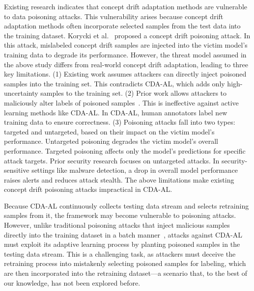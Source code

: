 Existing research indicates that concept drift adaptation methods are vulnerable to data poisoning attacks.
This vulnerability arises because concept drift adaptation methods often incorporate selected samples from the test data into the training dataset.
Korycki et al.~\cite{2023-CCF-B-Adversarial-concept-drift-detection-under-poisoning-attacks} proposed a concept drift poisoning attack. In this attack, mislabeled concept drift samples are injected into the victim model’s training data to degrade its performance.
However, the threat model assumed in the above study differs from real-world concept drift adaptation, leading to three key limitations.
(1) Existing work assumes attackers can directly inject poisoned samples into the training set.
This contradicts CDA-AL, which adds only high-uncertainty samples to the training set.
(2) Prior work allows attackers to maliciously alter labels of poisoned samples~\cite{2022-ACM-Computing-Survey-Threats-to-training}. This is ineffective against active learning methods like CDA-AL. In CDA-AL, human annotators label new training data to ensure correctness.
(3) Poisoning attacks fall into two types: targeted and untargeted, based on their impact on the victim model’s performance.
Untargeted poisoning degrades the victim model’s overall performance. Targeted poisoning affects only the model’s predictions for specific attack targets.
Prior security research focuses on untargeted attacks.
In security-sensitive settings like malware detection, a drop in overall model performance raises alerts and reduces attack stealth.
The above limitations make existing concept drift poisoning attacks impractical in CDA-AL.

Because CDA-AL continuously collects testing data stream and selects retraining samples from it, the framework may become vulnerable to poisoning attacks. 
However, unlike traditional poisoning attacks that inject malicious samples directly into the training dataset in a batch manner~\cite{2022-ACM-Computing-Survey-Threats-to-training, 2024-SP-Offline-RL-Backdoor,2018-NIPS-Poison-frogs,2018-SP-poisoning-regression,2024-TIFS-Backdoor-Contrastive-Learning}, attacks against CDA-AL must exploit its adaptive learning process by planting poisoned samples in the testing data stream. 
This is a challenging task, as attackers must deceive the retraining process into mistakenly selecting poisoned samples for labeling, which are then incorporated into the retraining dataset—a scenario that, to the best of our knowledge, has not been explored before.

